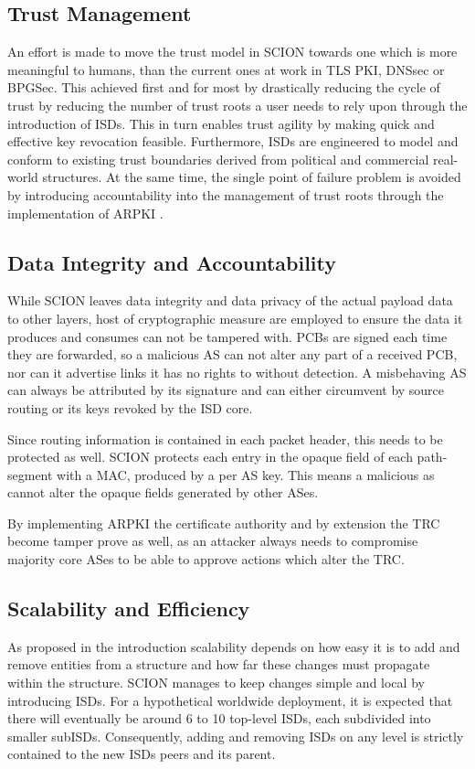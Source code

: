 \documentclass[../eva1_scion.tex]{subfiles}
\begin{document}
    \subsection{Trust Management}
    An effort is made to move the trust model in SCION towards one which is more meaningful to humans, than the current ones at work in TLS PKI, DNSsec or BPGSec. This achieved first and for most by drastically reducing the cycle of trust by reducing the number of trust roots a user needs to rely upon through the introduction of ISDs. This in turn enables trust agility by making quick and effective key revocation feasible. Furthermore, ISDs are engineered to model and conform to existing trust boundaries derived from political and commercial real-world structures. At the same time, the single point of failure problem is avoided by introducing accountability into the management of trust roots through the implementation of ARPKI \cite{arpki_2014, arpki_2018}.

    \subsection{Data Integrity and Accountability}
    While SCION leaves data integrity and data privacy of the actual payload data to other layers, host of cryptographic measure are employed to ensure the data it produces and consumes can not be tampered with. PCBs are signed each time they are forwarded, so a malicious AS can not alter any part of  a received PCB, nor can it advertise links it has no rights to without detection. A misbehaving AS can always be attributed by its signature and can either circumvent by source routing or its keys revoked by the ISD core.

    Since routing information is contained in each packet header, this needs to be protected as well. SCION protects each entry in the opaque field of each path-segment with a MAC, produced by a per AS key. This means a malicious as cannot alter the opaque fields generated by other ASes.

    By implementing ARPKI the certificate authority and by extension the TRC become tamper prove as well, as an attacker always needs to compromise majority core ASes to be able to approve actions which alter the TRC.

    \subsection{Scalability and Efficiency}
    As proposed in the introduction scalability depends on how easy it is to add and remove entities from a structure and how far these changes must propagate within the structure. SCION manages to keep changes simple and local by introducing ISDs. For a hypothetical worldwide deployment, it is expected that there will eventually be around 6 to 10 \cite{scion_2011} top-level ISDs, each subdivided into smaller subISDs. Consequently, adding and removing ISDs on any level is strictly contained to the new ISDs peers and its parent.
\end{document}
